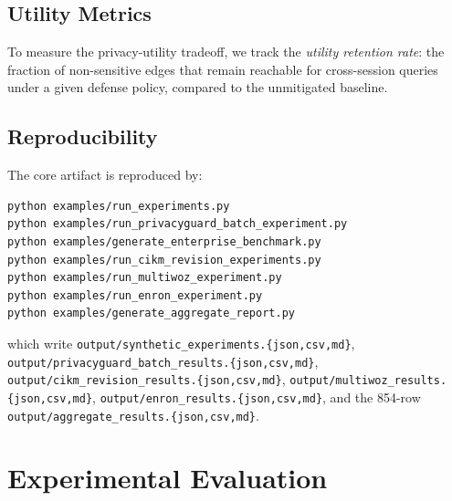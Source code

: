 \documentclass[journal,10pt,twocolumn]{IEEEtran}
\begin{document}
\subsection{Utility Metrics}
To measure the privacy-utility tradeoff, we track the \emph{utility retention rate}: 
the fraction of non-sensitive edges that remain reachable for cross-session queries 
under a given defense policy, compared to the unmitigated baseline.

\subsection{Reproducibility}
The core artifact is reproduced by:

\begin{verbatim}
python examples/run_experiments.py
python examples/run_privacyguard_batch_experiment.py
python examples/generate_enterprise_benchmark.py
python examples/run_cikm_revision_experiments.py
python examples/run_multiwoz_experiment.py
python examples/run_enron_experiment.py
python examples/generate_aggregate_report.py
\end{verbatim}

\noindent
which write \texttt{output/synthetic\_experiments.\{json,csv,md\}},
\texttt{output/privacyguard\_batch\_results.\{json,csv,md\}},
\texttt{output/cikm\_revision\_results.\{json,csv,md\}},
\texttt{output/multiwoz\_results.\{json,csv,md\}},
\texttt{output/enron\_results.\{json,csv,md\}}, and the 854-row
\texttt{output/aggregate\_results.\{json,csv,md\}}.

\section{Experimental Evaluation}
\label{sec:experiments}
\end{document}
